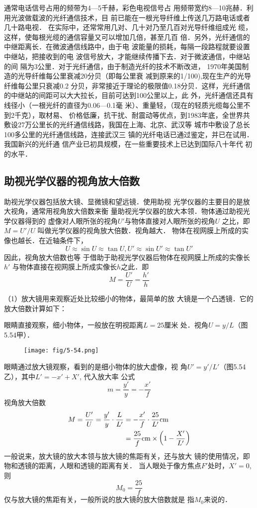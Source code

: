 通常电话信号占用的频带为4—5千赫，彩色电视信号占
用频带宽约8—10兆赫．利用光波做载波的光纤通信技术，目
前已能在一根光导纤维上传送几万路电话或者几十路电视．
在实际中，还常常用几对、几十对乃至几百对光导纤维组成光
缆，这样，使每根光缆的通信容量又可以增加几倍，甚至几百
倍．另外，光纤通信的中继距离长．在微波通信线路中，由于电
波能量的损耗，每隔一段路程就要设置中继站，把接收到的电
波信号放大，才能继续传播下去．对于微波通信，中继站的间
隔为3公里．对于光纤通信，由于制造光纤的技术不断改进，
1970年美国制造的光导纤维每公里衰减20分贝（即每公里衰
减到原来的1/100),现在生产的光导纤维每公里只衰减0.2
分贝，非常接近于理论的极限值0.18分贝．这样，光纤通信
的中继站的间距可以大大拉长，目前可达到100公里以上，此
外，光纤通信还具有线径小（一根光纤的直径为0.06—0.1毫
米）、重量轻，（现在的轻质光缆每公里不到2千克），取材易、
价格低廉，抗干扰、耐震动等优点，到1983年底，全世界共
敷设27万公里长的光纤通信线路，我国在上海、北京、武汉等
城市中敷设了总长100多公里的光纤通信线路，连接武汉三
镇的光纤电话已通过鉴定，并已在试用．我国新兴的光纤通
信产业已初具规模，在一些重要技术上已达到国际八十年代
初的水平．

\subsection{助视光学仪器的视角放大倍数}
助视光学仪器包括放大镜、显微镜和望远镜．使用助视
光学仪器的主要目的是放大视角，通常用视角放大倍数来衡
量助视光学仪器的放大本领．物体通过助视光学仪器得到的
虚像对人眼所张的视角$U'$与物体直接对人眼所张的视角$U$
之比，即$M=U'/U$
叫做光学仪器的视角放大倍数．视角越大．
物体在视网膜上所成的实像也越长．在近轴条件下，
\[U\approx \sin U\approx \tan U, U'\approx \sin U'\approx \tan U'\]
因此，视角放大倍数也等
于借助于助视光学仪器后物体在视网膜上所成的实像长$h'$
与物体直接在视网膜上所成实像长$h$之此．即
\[M=\frac{U'}{U}=\frac{h'}{h}\]

（1）放大镜用来观察近处比较细小的物体，最简单的放
大镜是一个凸透镜．它的放大倍数计算如下：

眼睛直接观察，细小物体，一般放在明视距离$L=25$厘米
处．视角$U=y/L$（图5.54甲）．

\begin{figure}[htp]\centering
    \texttt{[image: fig/5-54.png]}
        \caption{}
        \end{figure}

眼睛通过放大镜观察，看到的是细小物体的放大虚像，视
角$U'=y'/L'$（图5.54乙），其中$L'=-x'+X'$, 代入放大率
公式
\[m=\frac{y'}{y}=-\frac{x'}{f}\]
视角放大倍数
\[\begin{split}
    M=\frac{U'}{U}=\frac{y'}{y}\cdot \frac{L}{L'}&=-\frac{x'}{f}\cdot \frac{25}{L'}{\rm cm}\\
    &=\frac{25}{f}{\rm cm}\times \left(1-\frac{X'}{L'}\right)
\end{split}\]
一般说来，放大镜的放大本领与放大镜的焦距有关，还与放大
镜的使用情况，即物和透镜的距离，人眼和透镜的距离有关．
当人眼处于像方焦点$F'$处时，$X'=0$, 则
\[M_0=\frac{25}{f}\]
仅与放大镜的焦距有关，一般所说的放大镜的放大倍数就是
指$M_0$来说的．

